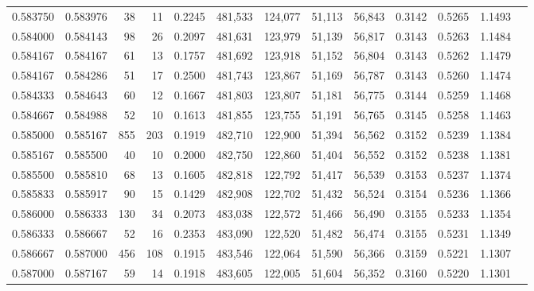 \begin{tabular}{rrrrrrrrrrrrr}
0.583750 & 0.583976 &    38 &  11 &                                     0.2245 & 481,533 & 124,077 &  51,113 &  56,843 & 0.3142 & 0.5265 & 1.1493 \\
0.584000 & 0.584143 &    98 &  26 &                                     0.2097 & 481,631 & 123,979 &  51,139 &  56,817 & 0.3143 & 0.5263 & 1.1484 \\
0.584167 & 0.584167 &    61 &  13 &                                     0.1757 & 481,692 & 123,918 &  51,152 &  56,804 & 0.3143 & 0.5262 & 1.1479 \\
0.584167 & 0.584286 &    51 &  17 &                                     0.2500 & 481,743 & 123,867 &  51,169 &  56,787 & 0.3143 & 0.5260 & 1.1474 \\
0.584333 & 0.584643 &    60 &  12 &                                     0.1667 & 481,803 & 123,807 &  51,181 &  56,775 & 0.3144 & 0.5259 & 1.1468 \\
0.584667 & 0.584988 &    52 &  10 &                                     0.1613 & 481,855 & 123,755 &  51,191 &  56,765 & 0.3145 & 0.5258 & 1.1463 \\
0.585000 & 0.585167 &   855 & 203 &                                     0.1919 & 482,710 & 122,900 &  51,394 &  56,562 & 0.3152 & 0.5239 & 1.1384 \\
0.585167 & 0.585500 &    40 &  10 &                                     0.2000 & 482,750 & 122,860 &  51,404 &  56,552 & 0.3152 & 0.5238 & 1.1381 \\
0.585500 & 0.585810 &    68 &  13 &                                     0.1605 & 482,818 & 122,792 &  51,417 &  56,539 & 0.3153 & 0.5237 & 1.1374 \\
0.585833 & 0.585917 &    90 &  15 &                                     0.1429 & 482,908 & 122,702 &  51,432 &  56,524 & 0.3154 & 0.5236 & 1.1366 \\
0.586000 & 0.586333 &   130 &  34 &                                     0.2073 & 483,038 & 122,572 &  51,466 &  56,490 & 0.3155 & 0.5233 & 1.1354 \\
0.586333 & 0.586667 &    52 &  16 &                                     0.2353 & 483,090 & 122,520 &  51,482 &  56,474 & 0.3155 & 0.5231 & 1.1349 \\
0.586667 & 0.587000 &   456 & 108 &                                     0.1915 & 483,546 & 122,064 &  51,590 &  56,366 & 0.3159 & 0.5221 & 1.1307 \\
0.587000 & 0.587167 &    59 &  14 &                                     0.1918 & 483,605 & 122,005 &  51,604 &  56,352 & 0.3160 & 0.5220 & 1.1301 \\

\end{tabular}
